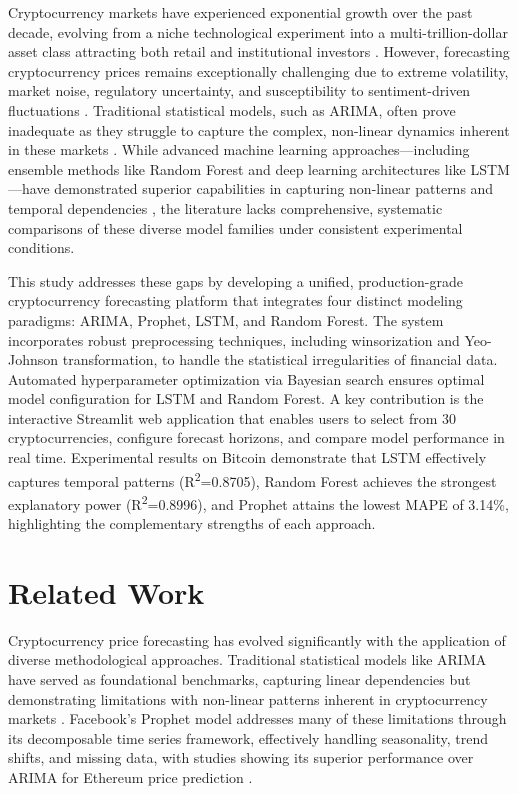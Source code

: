 \documentclass[conference]{IEEEtran}
\begin{document}
Cryptocurrency markets have experienced exponential growth over the past decade, evolving from a niche technological experiment into a multi-trillion-dollar asset class attracting both retail and institutional investors \cite{ren2022, fang2022}. However, forecasting cryptocurrency prices remains exceptionally challenging due to extreme volatility, market noise, regulatory uncertainty, and susceptibility to sentiment-driven fluctuations \cite{mcnally2018}. Traditional statistical models, such as ARIMA, often prove inadequate as they struggle to capture the complex, non-linear dynamics inherent in these markets \cite{catania2019}. While advanced machine learning approaches—including ensemble methods like Random Forest and deep learning architectures like LSTM—have demonstrated superior capabilities in capturing non-linear patterns and temporal dependencies \cite{chowdhury2020, sun2020, hochreiter1997}, the literature lacks comprehensive, systematic comparisons of these diverse model families under consistent experimental conditions.

This study addresses these gaps by developing a unified, production-grade cryptocurrency forecasting platform that integrates four distinct modeling paradigms: ARIMA, Prophet, LSTM, and Random Forest. The system incorporates robust preprocessing techniques, including winsorization and Yeo-Johnson transformation, to handle the statistical irregularities of financial data. Automated hyperparameter optimization via Bayesian search ensures optimal model configuration for LSTM and Random Forest. A key contribution is the interactive Streamlit web application that enables users to select from 30 cryptocurrencies, configure forecast horizons, and compare model performance in real time. Experimental results on Bitcoin demonstrate that LSTM effectively captures temporal patterns (R\textsuperscript{2}=0.8705), Random Forest achieves the strongest explanatory power (R\textsuperscript{2}=0.8996), and Prophet attains the lowest MAPE of 3.14\%, highlighting the complementary strengths of each approach.



\section{Related Work}

Cryptocurrency price forecasting has evolved significantly with the application of diverse methodological approaches. Traditional statistical models like ARIMA have served as foundational benchmarks, capturing linear dependencies but demonstrating limitations with non-linear patterns inherent in cryptocurrency markets \cite{bakar2017, mcnally2018}. Facebook's Prophet model addresses many of these limitations through its decomposable time series framework, effectively handling seasonality, trend shifts, and missing data, with studies showing its superior performance over ARIMA for Ethereum price prediction \cite{taylor2018, sailaja2024, jha2021}.
\end{document}
